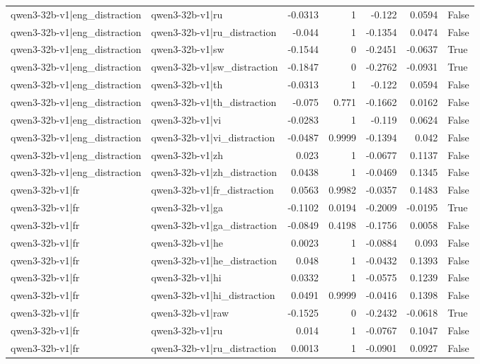 \begin{table}
\begin{tabular}{l l r r r r l}
qwen3-32b-v1|eng_distraction & qwen3-32b-v1|ru & -0.0313 & 1 & -0.122 & 0.0594 & False \\
qwen3-32b-v1|eng_distraction & qwen3-32b-v1|ru_distraction & -0.044 & 1 & -0.1354 & 0.0474 & False \\
qwen3-32b-v1|eng_distraction & qwen3-32b-v1|sw & -0.1544 & 0 & -0.2451 & -0.0637 & True \\
qwen3-32b-v1|eng_distraction & qwen3-32b-v1|sw_distraction & -0.1847 & 0 & -0.2762 & -0.0931 & True \\
qwen3-32b-v1|eng_distraction & qwen3-32b-v1|th & -0.0313 & 1 & -0.122 & 0.0594 & False \\
qwen3-32b-v1|eng_distraction & qwen3-32b-v1|th_distraction & -0.075 & 0.771 & -0.1662 & 0.0162 & False \\
qwen3-32b-v1|eng_distraction & qwen3-32b-v1|vi & -0.0283 & 1 & -0.119 & 0.0624 & False \\
qwen3-32b-v1|eng_distraction & qwen3-32b-v1|vi_distraction & -0.0487 & 0.9999 & -0.1394 & 0.042 & False \\
qwen3-32b-v1|eng_distraction & qwen3-32b-v1|zh & 0.023 & 1 & -0.0677 & 0.1137 & False \\
qwen3-32b-v1|eng_distraction & qwen3-32b-v1|zh_distraction & 0.0438 & 1 & -0.0469 & 0.1345 & False \\
qwen3-32b-v1|fr & qwen3-32b-v1|fr_distraction & 0.0563 & 0.9982 & -0.0357 & 0.1483 & False \\
qwen3-32b-v1|fr & qwen3-32b-v1|ga & -0.1102 & 0.0194 & -0.2009 & -0.0195 & True \\
qwen3-32b-v1|fr & qwen3-32b-v1|ga_distraction & -0.0849 & 0.4198 & -0.1756 & 0.0058 & False \\
qwen3-32b-v1|fr & qwen3-32b-v1|he & 0.0023 & 1 & -0.0884 & 0.093 & False \\
qwen3-32b-v1|fr & qwen3-32b-v1|he_distraction & 0.048 & 1 & -0.0432 & 0.1393 & False \\
qwen3-32b-v1|fr & qwen3-32b-v1|hi & 0.0332 & 1 & -0.0575 & 0.1239 & False \\
qwen3-32b-v1|fr & qwen3-32b-v1|hi_distraction & 0.0491 & 0.9999 & -0.0416 & 0.1398 & False \\
qwen3-32b-v1|fr & qwen3-32b-v1|raw & -0.1525 & 0 & -0.2432 & -0.0618 & True \\
qwen3-32b-v1|fr & qwen3-32b-v1|ru & 0.014 & 1 & -0.0767 & 0.1047 & False \\
qwen3-32b-v1|fr & qwen3-32b-v1|ru_distraction & 0.0013 & 1 & -0.0901 & 0.0927 & False \\

\end{tabular}
\end{table}
